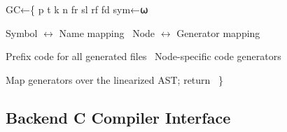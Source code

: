 \documentclass{article}%
\begin{document}
\nwenddocs{}\endmoddef\nwstartdeflinemarkup{}\nwenddeflinemarkup
GC←\{
        p t k n fr sl rf fd  sym←⍵

        \LA{}Symbol $\longleftrightarrow$ Name mapping~{\nwtagstyle{}}\RA{}
        \LA{}Node $\longleftrightarrow$ Generator mapping~{\nwtagstyle{}}\RA{}

        \LA{}Prefix code for all generated files~{\nwtagstyle{}}\RA{}
        \LA{}Node-specific code generators~{\nwtagstyle{}}\RA{}

        \LA{}Map generators over the linearized AST; return~{\nwtagstyle{}}\RA{}
\}
\nwendcode{}\nwdocspar

\subsection{Backend C Compiler Interface}
\end{document}
